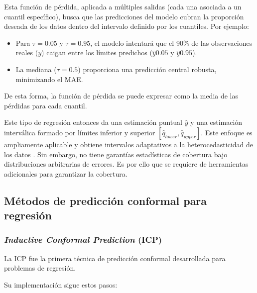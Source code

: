 \begin{itemize}
    Esta función de pérdida, aplicada a múltiples salidas (cada una asociada a un cuantil específico), busca 
    que las predicciones del modelo cubran la proporción deseada de los datos dentro del intervalo definido 
    por los cuantiles. Por ejemplo:

    \begin{itemize}

        \item Para $\tau = 0.05$ y $\tau = 0.95$, el modelo intentará que el 90\% de las observaciones reales 
        ($y$) caigan entre los límites predichos ($\hat{y}{0.05}$ y $\hat{y}{0.95}$).

        \item La mediana ($\tau = 0.5$) proporciona una predicción central robusta, minimizando el MAE.
        
    \end{itemize}

    De esta forma, la función de pérdida se puede expresar como la media de las pérdidas para cada cuantil.

\end{itemize}

Este tipo de regresión entonces da una estimación puntual $\hat{y}$ y una estimación interválica formado por 
límites inferior y superior $\left[ \hat{q}_{lower}, \hat{q}_{upper} \right]$. Este enfoque es ampliamente
aplicable y obtiene intervalos adaptativos a la heterocedasticidad de los datos \cite{romano2019}. 
Sin embargo, no tiene garantías estadísticas de cobertura bajo distribuciones arbitrarias de errores.
Es por ello que se requiere de herramientas adicionales para garantizar la cobertura.


\subsection{Métodos de predicción conformal para regresión}


\subsubsection{\textit{Inductive Conformal Prediction} (ICP)}

La ICP \cite{papadopoulos2002} fue la primera técnica de predicción conformal desarrollada para problemas de 
regresión. 

Su implementación sigue estos pasos:

